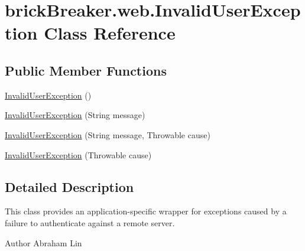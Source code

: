 \hypertarget{classbrick_breaker_1_1web_1_1_invalid_user_exception}{
\section{brickBreaker.web.InvalidUserException Class Reference}
\label{classbrick_breaker_1_1web_1_1_invalid_user_exception}
}
\subsection*{Public Member Functions}
\begin{DoxyCompactItemize}
\item 
\hyperlink{classbrick_breaker_1_1web_1_1_invalid_user_exception_a500ab07a78ed1ea1f51c685772ec3b11}{InvalidUserException} ()
\item 
\hyperlink{classbrick_breaker_1_1web_1_1_invalid_user_exception_a28a46f03e800b69aca69071687c4a53d}{InvalidUserException} (String message)
\item 
\hyperlink{classbrick_breaker_1_1web_1_1_invalid_user_exception_a1b99af54f90e802a18f6eb4b65cfa5aa}{InvalidUserException} (String message, Throwable cause)
\item 
\hyperlink{classbrick_breaker_1_1web_1_1_invalid_user_exception_a3d20137414f9e52364048c36045ffac0}{InvalidUserException} (Throwable cause)
\end{DoxyCompactItemize}


\subsection{Detailed Description}
This class provides an application-\/specific wrapper for exceptions caused by a failure to authenticate against a remote server.

\begin{DoxyAuthor}{Author}
Abraham Lin 
\end{DoxyAuthor}


